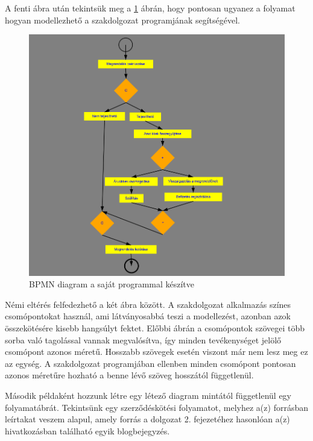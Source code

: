 A fenti ábra után tekintsük meg a \ref{fig:bpmn1} ábrán, hogy pontosan ugyanez a folyamat hogyan modellezhető a szakdolgozat programjának segítségével.

\begin{figure}[h]
\centering
\includegraphics[scale=0.6]{images/pelda1.png}
\caption{BPMN diagram a saját programmal készítve}
\label{fig:bpmn1}
\end{figure}

Némi eltérés felfedezhető a két ábra között. A szakdolgozat alkalmazás színes csomópontokat használ, ami látványosabbá teszi a modellezést, azonban azok összekötésére kisebb hangsúlyt fektet. Előbbi ábrán a csomópontok szövegei több sorba való tagolással vannak megvalósítva, így minden tevékenységet jelölő csomópont azonos méretű. Hosszabb szövegek esetén viszont már nem lesz meg ez az egység. A szakdolgozat programjában ellenben minden csomópont pontosan azonos méretűre hozható a benne lévő szöveg hosszától függetlenül.


Második példaként hozzunk létre egy létező diagram mintától függetlenül egy folyamatábrát. Tekintsünk egy szerződéskötési folyamatot, melyhez a(z) \cite{xflowutolso} forrásban leírtakat veszem alapul, amely forrás a dolgozat 2. fejezetéhez hasonlóan a(z) \cite{xflower} hivatkozásban található egyik blogbejegyzés.

